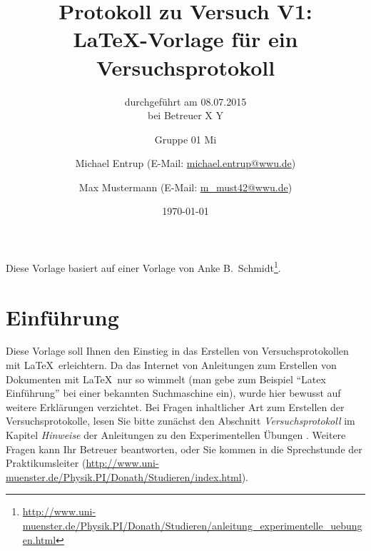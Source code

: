 \documentclass[
	fontsize=11pt,
	paper=a4,
	pagesize=auto,
	parskip=false,
	titlepage=on,
	ngerman
]{scrartcl}
\begin{document}
\title{
	Protokoll zu Versuch V1:\\
	\LaTeX-Vorlage für ein Versuchsprotokoll
}
\subtitle{
	durchgeführt am 08.07.2015\\
	bei Betreuer X Y
}
\author{
	Gruppe 01 Mi\and
	Michael Entrup (E-Mail: \url{michael.entrup@wwu.de}) \and
	Max Mustermann (E-Mail: \url{m_must42@wwu.de})
}
\date{\today}

\maketitle

\newpage

\tableofcontents

\newpage

Diese Vorlage basiert auf einer Vorlage von Anke B.\ Schmidt\footnote{\url{http://www.uni-muenster.de/Physik.PI/Donath/Studieren/anleitung_experimentelle_uebungen.html}}.

\section{Einführung}

Diese Vorlage soll Ihnen den Einstieg in das Erstellen von Versuchsprotokollen mit \LaTeX\ erleichtern. Da das Internet von Anleitungen zum Erstellen von Dokumenten mit \LaTeX\ nur so wimmelt (man gebe zum Beispiel ``Latex Einführung'' bei einer bekannten Suchmaschine ein), wurde hier bewusst auf weitere Erklärungen verzichtet. Bei Fragen inhaltlicher Art zum Erstellen der Versuchsprotokolle, lesen Sie bitte zunächst den Abschnitt \emph{Versuchsprotokoll} im Kapitel \emph{Hinweise} der Anleitungen zu den Experimentellen Übungen \cite{anleitung}. Weitere Fragen kann Ihr Betreuer beantworten, oder Sie kommen in die Sprechstunde der Praktikumsleiter (\url{http://www.uni-muenster.de/Physik.PI/Donath/Studieren/index.html}).
\end{document}
